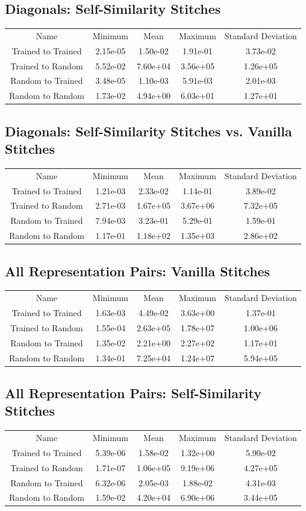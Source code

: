 \documentclass{article} %
\begin{document}
\subsection*{Diagonals: Self-Similarity Stitches}
\begin{tabular}{c c c c c}
   Name&Minimum&Mean&Maximum&Standard Deviation\\
   Trained to Trained&2.15e-05&1.50e-02&1.91e-01&3.73e-02\\
   Trained to Random&5.52e-02&7.60e+04&3.56e+05&1.26e+05\\
   Random to Trained&3.48e-05&1.10e-03&5.91e-03&2.01e-03\\
   Random to Random&1.73e-02&4.94e+00&6.03e+01&1.27e+01\\
\end{tabular}
\subsection*{Diagonals: Self-Similarity Stitches vs. Vanilla Stitches}
\begin{tabular}{c c c c c}
   Name&Minimum&Mean&Maximum&Standard Deviation\\
   Trained to Trained&1.21e-03&2.33e-02&1.14e-01&3.89e-02\\
   Trained to Random&2.71e-03&1.67e+05&3.67e+06&7.32e+05\\
   Random to Trained&7.94e-03&3.23e-01&5.29e-01&1.59e-01\\
   Random to Random&1.17e-01&1.18e+02&1.35e+03&2.86e+02\\
\end{tabular}
\subsection*{All Representation Pairs: Vanilla Stitches}
\begin{tabular}{c c c c c}
   Name&Minimum&Mean&Maximum&Standard Deviation\\
   Trained to Trained&1.63e-03&4.49e-02&3.63e+00&1.37e-01\\
   Trained to Random&1.55e-04&2.63e+05&1.78e+07&1.00e+06\\
   Random to Trained&1.35e-02&2.21e+00&2.27e+02&1.17e+01\\
   Random to Random&1.34e-01&7.25e+04&1.24e+07&5.94e+05\\
\end{tabular}
\subsection*{All Representation Pairs: Self-Similarity Stitches}
\begin{tabular}{c c c c c}
   Name&Minimum&Mean&Maximum&Standard Deviation\\
   Trained to Trained&5.39e-06&1.58e-02&1.32e+00&5.90e-02\\
   Trained to Random&1.71e-07&1.06e+05&9.19e+06&4.27e+05\\
   Random to Trained&6.32e-06&2.05e-03&1.88e-02&4.31e-03\\
   Random to Random&1.59e-02&4.20e+04&6.90e+06&3.44e+05\\
\end{tabular}
\end{document}
